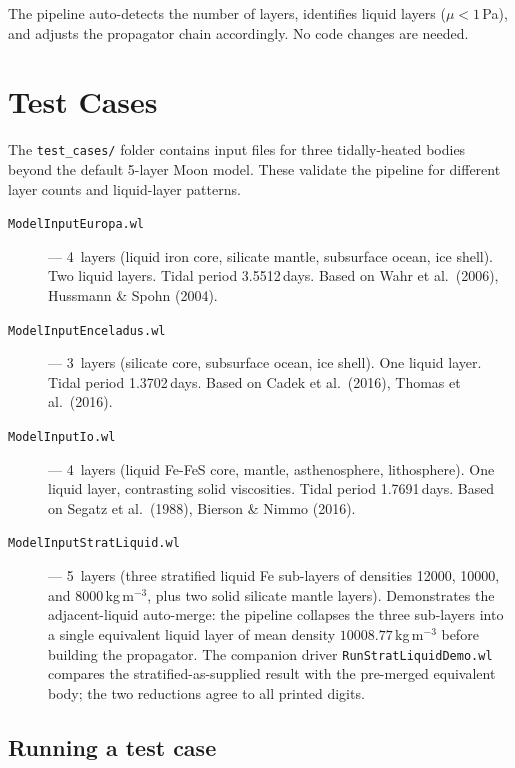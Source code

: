\documentclass[11pt]{article}
\begin{document}
The pipeline auto-detects the number of layers, identifies liquid
layers ($\mu < 1$\,Pa), and adjusts the propagator chain accordingly.
No code changes are needed.

\section{Test Cases}
\label{sec:testcases}

The \texttt{test\_cases/} folder contains input files for three
tidally-heated bodies beyond the default 5-layer Moon model.  These
validate the pipeline for different layer counts and liquid-layer
patterns.

\begin{description}
  \item[\texttt{ModelInputEuropa.wl}] --- 4~layers (liquid iron core,
    silicate mantle, subsurface ocean, ice shell).  Two liquid layers.
    Tidal period 3.5512\,days.  Based on Wahr et al.\ (2006),
    Hussmann \& Spohn (2004).
  \item[\texttt{ModelInputEnceladus.wl}] --- 3~layers (silicate core,
    subsurface ocean, ice shell).  One liquid layer.  Tidal period
    1.3702\,days.  Based on Cadek et al.\ (2016), Thomas et al.\
    (2016).
  \item[\texttt{ModelInputIo.wl}] --- 4~layers (liquid Fe-FeS core,
    mantle, asthenosphere, lithosphere).  One liquid layer, contrasting
    solid viscosities.  Tidal period 1.7691\,days.  Based on Segatz
    et al.\ (1988), Bierson \& Nimmo (2016).
  \item[\texttt{ModelInputStratLiquid.wl}] --- 5~layers (three
    stratified liquid Fe sub-layers of densities 12000, 10000, and
    8000\,kg\,m$^{-3}$, plus two solid silicate mantle layers).
    Demonstrates the adjacent-liquid auto-merge: the pipeline
    collapses the three sub-layers into a single equivalent liquid
    layer of mean density $10008.77$\,kg\,m$^{-3}$ before building
    the propagator. The companion driver \texttt{RunStratLiquidDemo.wl}
    compares the stratified-as-supplied result with the pre-merged
    equivalent body; the two reductions agree to all printed digits.
\end{description}

\subsection{Running a test case}
\end{document}
